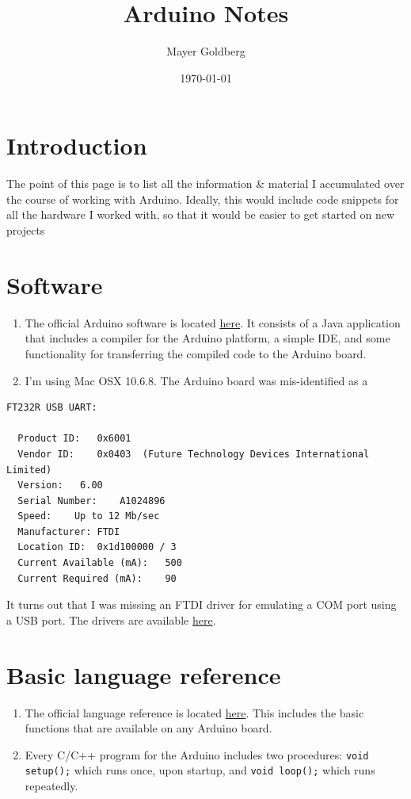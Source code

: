 \documentclass[11pt]{article}
\author{Mayer Goldberg}
\date{\today}
\title{Arduino Notes}
\begin{document}
\maketitle
\tableofcontents


\section{Introduction}
\label{sec-1}

The point of this page is to list all the information \& material I accumulated over the course of working with Arduino. Ideally, this would include code snippets for all the hardware I worked with, so that it would be easier to get started on new projects
\section{Software}
\label{sec-2}

\begin{enumerate}
\item The official Arduino software is located \href{http://arduino.cc/}{here}. It consists of a Java application that includes a compiler for the Arduino platform, a simple IDE, and some functionality for transferring the compiled code to the Arduino board.
\item I'm using Mac OSX 10.6.8. The Arduino board was mis-identified as a
\end{enumerate}

\begin{verbatim}
FT232R USB UART:

  Product ID:	0x6001
  Vendor ID:	0x0403  (Future Technology Devices International Limited)
  Version:	 6.00
  Serial Number:	A1024896
  Speed:	Up to 12 Mb/sec
  Manufacturer:	FTDI
  Location ID:	0x1d100000 / 3
  Current Available (mA):	500
  Current Required (mA):	90
\end{verbatim}

It turns out that I was missing an FTDI driver for emulating a COM port using a USB port. The drivers are available \href{http://www.ftdichip.com/FTDrivers.htm}{here}. 

\section{Basic language reference}
\label{sec-3}

\begin{enumerate}
\item The official language reference is located \href{http://arduino.cc/en/Reference/HomePage}{here}. This includes the basic functions that are available on any Arduino board.

\item Every C/C++ program for the Arduino includes two procedures: \texttt{void setup();} which runs once, upon startup, and \texttt{void loop();} which runs repeatedly.
\end{enumerate}
\end{document}
